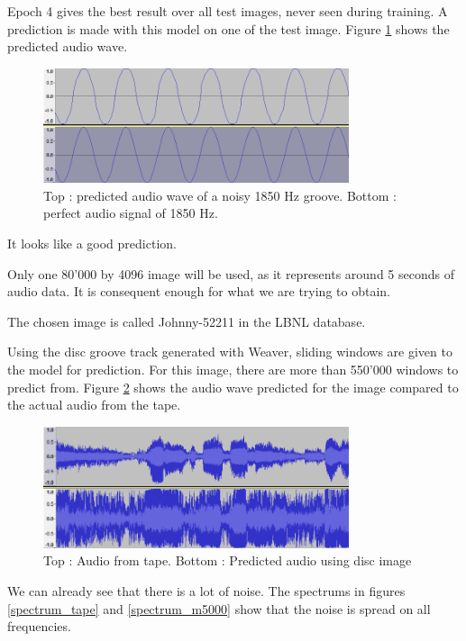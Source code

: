 \documentclass[12pt, twoside]{article}
\begin{document}
Epoch 4 gives the best result over all test images, never seen during training. A prediction is made with this model on one of the test image. Figure \ref{comp_m5000} shows the predicted audio wave.

\begin{figure}
	\centering
	\includegraphics[width=0.8\textwidth]{../images/comp_m5000.png}
	\caption{Top : predicted audio wave of a noisy 1850 Hz groove. Bottom : perfect audio signal of 1850 Hz.}
	\label{comp_m5000}
\end{figure}

It looks like a good prediction.

Only one 80'000 by 4096 image will be used, as it represents around 5 seconds of audio data. It is consequent enough for what we are trying to obtain.

The chosen image is called Johnny-52211 in the LBNL database.

Using the disc groove track generated with Weaver, sliding windows are given to the model for prediction. For this image, there are more than 550'000 windows to predict from. Figure \ref{proto4_v1_wave} shows the audio wave predicted for the image compared to the actual audio from the tape.

\begin{figure}
	\centering
	\includegraphics[width=0.8\textwidth]{../images/proto4_v1_wave.png}
	\caption{Top : Audio from tape. Bottom : Predicted audio using disc image}
	\label{proto4_v1_wave}
\end{figure}

We can already see that there is a lot of noise. The spectrums in figures \ref{spectrum_tape} and \ref{spectrum_m5000} show that the noise is spread on all frequencies.
\end{document}
